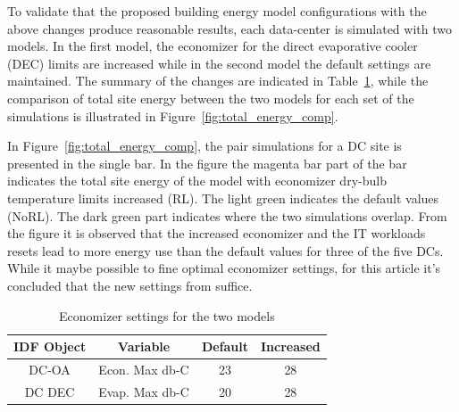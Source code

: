 To validate that the proposed building energy model configurations with the above changes produce reasonable results, each data-center is simulated with two models. In the first model, the economizer for the direct evaporative cooler (DEC) limits are increased while in the second model the default settings are maintained. The summary of the changes are indicated in Table~\ref{table:tab01}, while the comparison of total site energy between the two models for each set of the simulations is illustrated in Figure~\ref{fig:total_energy_comp}. 

In Figure~\ref{fig:total_energy_comp}, the pair simulations for a DC site is presented in the single bar. In the figure the magenta bar part of the bar indicates the total site energy of the model with economizer dry-bulb temperature limits increased (RL). The light green indicates the default values (NoRL). The dark green part indicates where the two simulations overlap. From the figure it is observed that the increased economizer and the IT workloads resets lead to more energy use than the default values for three of the five DCs. While it maybe possible to fine optimal economizer settings, for this article it's concluded that the new settings from suffice. 

 \begin{center}
  \begin{table}[ht]
  \begin{center}
  \begin{small}
    \vspace{-10 pt}
    \caption{Economizer settings for the two models}
    \label{table:tab01}
    \centering
    \begin{tabular}{| c | c | c |c| }
      \hline
      IDF Object & Variable & Default & Increased\\
      \hline  \hline
      DC-OA & Econ. Max db-C & 23 & 28 \\
      \hline
      DC DEC & Evap. Max db-C & 20 & 28 \\
      \hline
    \end{tabular}
    \vspace{-8 pt}   %
    \end{small}
    \end{center} 
    \end{table}
  \end{center} 




